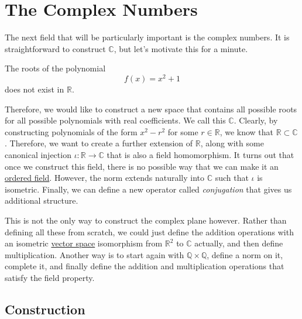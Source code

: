 \section{The Complex Numbers} 

  The next field that will be particularly important is the complex numbers. It is straightforward to construct $\mathbb{C}$, but let's motivate this for a minute. 

  \begin{example}
    \label{ex:polynomial-roots}
    The roots of the polynomial 
    \begin{equation}
      f(x) = x^2 + 1
    \end{equation}
    does not exist in $\mathbb{R}$. 
  \end{example} 

  Therefore, we would like to construct a new space that contains all possible roots for all possible polynomials with real coefficients. We call this $\mathbb{C}$. Clearly, by constructing polynomials of the form $x^2 - r^2$ for some $r \in \mathbb{R}$, we know that $\mathbb{R} \subset \mathbb{C}$. Therefore, we want to create a further extension of $\mathbb{R}$, along with some canonical injection $\iota: \mathbb{R} \rightarrow \mathbb{C}$ that is also a field homomorphism. It turns out that once we construct this field, there is no possible way that we can make it an \hyperref[alg-def:ordered-field]{ordered field}. However, the norm extends naturally into $\mathbb{C}$ such that $\iota$ is isometric. Finally, we can define a new operator called \textit{conjugation} that gives us additional structure. 

  This is not the only way to construct the complex plane however. Rather than defining all these from scratch, we could just define the addition operations with an isometric \hyperref[lin-def:vector-space]{vector space} isomorphism from $\mathbb{R}^2$ to $\mathbb{C}$ actually, and then define multiplication. Another way is to start again with $\mathbb{Q} \times \mathbb{Q}$, define a norm on it, complete it, and finally define the addition and multiplication operations that satisfy the field property.   

\subsection{Construction}

